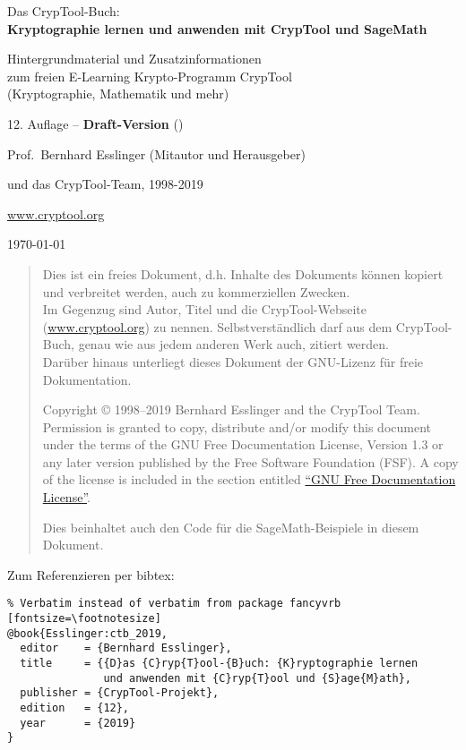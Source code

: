 {\centering
\strut\vfill
{\fontsize{30pt}{30pt}\selectfont Das CrypTool-Buch:}\\[\baselineskip]
\textbf{\fontsize{35pt}{35pt}\selectfont Kryptographie lernen und anwenden
                mit CrypTool und SageMath}

{\LARGE Hintergrundmaterial und Zusatzinformationen\\
	 zum freien E-Learning Krypto-Programm CrypTool\\
	 (Kryptographie, Mathematik und mehr)}

	 {\large 12. Auflage --  {\bf Draft-Version} (\currenttime)}
\vfill
	{\fontsize{25pt}{25pt}\selectfont Prof.\ Bernhard Esslinger (Mitautor und Herausgeber)

	und das CrypTool-Team, 1998-2019}

	\url{www.cryptool.org}

	\today

\vfill
}%

\newpage

\begin{quote}
Dies ist ein freies Dokument, d.h. Inhalte des Dokuments können kopiert und
verbreitet werden, auch zu kommerziellen Zwecken.\\
Im Gegenzug sind Autor, Titel und die CrypTool-Webseite (\url{www.cryptool.org}) zu
nennen. Selbstverständlich darf aus dem CrypTool-Buch, genau wie aus jedem
anderen Werk auch, zitiert werden. \\
Darüber hinaus unterliegt dieses Dokument der GNU-Lizenz für freie
Dokumentation.

    Copyright \copyright{} 1998--2019 Bernhard Esslinger and the
    CrypTool Team. Permission is granted to copy,
    distribute and/or modify this document under the terms of the GNU
    Free Documentation License, Version 1.3 or any later version
    published by the Free Software Foundation (FSF). A copy of
    the license is included in the section entitled
    \hyperlink{appendix-GNU-fdl}{``GNU Free Documentation License''}.

    Dies beinhaltet auch den Code für die SageMath-Beispiele in diesem Dokument.
\end{quote}



\vspace{70pt}Zum Referenzieren per bibtex:
\begin{Verbatim}% Verbatim instead of verbatim from package fancyvrb
[fontsize=\footnotesize]
@book{Esslinger:ctb_2019,
  editor    = {Bernhard Esslinger},
  title     = {{D}as {C}ryp{T}ool-{B}uch: {K}ryptographie lernen
               und anwenden mit {C}ryp{T}ool und {S}age{M}ath},
  publisher = {CrypTool-Projekt},
  edition   = {12},
  year      = {2019}
}
\end{Verbatim}



